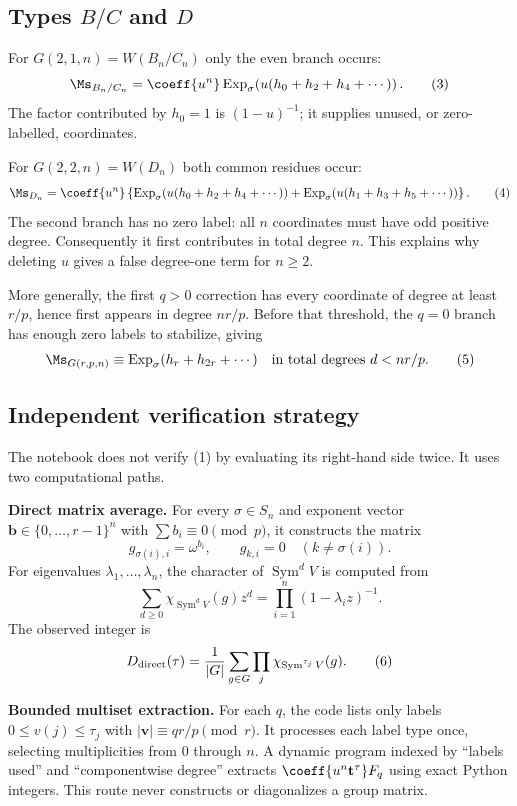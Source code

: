 \documentclass[10pt]{article}
\newcommand{\Sym}{\operatorname{Sym}}
\newcommand{\ExpS}{\operatorname{Exp}_{\sigma}}
\begin{document}
\subsection{Types \texorpdfstring{$B/C$ and $D$}{B/C and D}}

For $G(2,1,n)=W(B_n/C_n)$ only the even branch occurs:
\[
\Ms_{B_n/C_n}=\coeff{u^n}\ExpS\!\left(u(h_0+h_2+h_4+\cdots)\right).
\tag{3}
\]
The factor contributed by $h_0=1$ is $(1-u)^{-1}$; it supplies unused, or
zero-labelled, coordinates.

For $G(2,2,n)=W(D_n)$ both common residues occur:
\[
\Ms_{D_n}=\coeff{u^n}\left\{
\ExpS\!\left(u(h_0+h_2+h_4+\cdots)\right)
+\ExpS\!\left(u(h_1+h_3+h_5+\cdots)\right)\right\}.
\tag{4}
\]
The second branch has no zero label: all $n$ coordinates must have odd positive
degree.  Consequently it first contributes in total degree $n$.  This explains
why deleting $u$ gives a false degree-one term for $n\geq2$.

More generally, the first $q>0$ correction has every coordinate of degree at
least $r/p$, hence first appears in degree $nr/p$.  Before that threshold, the
$q=0$ branch has enough zero labels to stabilize, giving
\[
\Ms_{G(r,p,n)}\equiv\ExpS(h_r+h_{2r}+\cdots)
\quad\text{in total degrees }d<nr/p.
\tag{5}
\]

\subsection{Independent verification strategy}

The notebook does not verify (1) by evaluating its right-hand side twice.
It uses two computational paths.

\textbf{Direct matrix average.}
For every $\sigma\in S_n$ and exponent vector
$\mathbf b\in\{0,\ldots,r-1\}^n$ with $\sum b_i\equiv0\pmod p$, it constructs
the matrix
\[
g_{\sigma(i),i}=\omega^{b_i},\qquad g_{k,i}=0\quad(k\neq\sigma(i)).
\]
For eigenvalues $\lambda_1,\ldots,\lambda_n$, the character of $\Sym^dV$ is
computed from
\[
\sum_{d\geq0}\chi_{\Sym^dV}(g)z^d
=\prod_{i=1}^n(1-\lambda_i z)^{-1}.
\]
The observed integer is
\[
D_{\rm direct}(\tau)=\frac1{|G|}\sum_{g\in G}
\prod_j\chi_{\Sym^{\tau_j}V}(g).
\tag{6}
\]

\textbf{Bounded multiset extraction.}
For each $q$, the code lists only labels
$0\leq v(j)\leq\tau_j$ with $|\mathbf v|\equiv qr/p\pmod r$.  It processes each
label type once, selecting multiplicities from $0$ through $n$.  A dynamic
program indexed by ``labels used'' and ``componentwise degree'' extracts
$\coeff{u^n\mathbf t^\tau}F_q$ using exact Python integers.  This route never
constructs or diagonalizes a group matrix.
\end{document}
